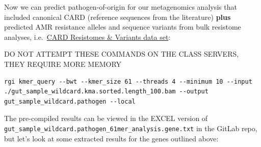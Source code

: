 \documentclass[
]{book}
\begin{document}
Now we can predict pathogen-of-origin for our metagenomics analysis that included canonical CARD (reference sequences from the literature) \textbf{plus} predicted AMR resistance alleles and sequence variants from bulk resistome analyses, i.e.~\href{https://card.mcmaster.ca/resistomes}{CARD Resistomes \& Variants data set}:

DO NOT ATTEMPT THESE COMMANDS ON THE CLASS SERVERS, THEY REQUIRE MORE MEMORY

\begin{verbatim}
rgi kmer_query --bwt --kmer_size 61 --threads 4 --minimum 10 --input ./gut_sample_wildcard.kma.sorted.length_100.bam --output gut_sample_wildcard.pathogen --local
\end{verbatim}

The pre-compiled results can be viewed in the EXCEL version of \texttt{gut\_sample\_wildcard.pathogen\_61mer\_analysis.gene.txt} in the GitLab repo, but let's look at some extracted results for the genes outlined above:
\end{document}
